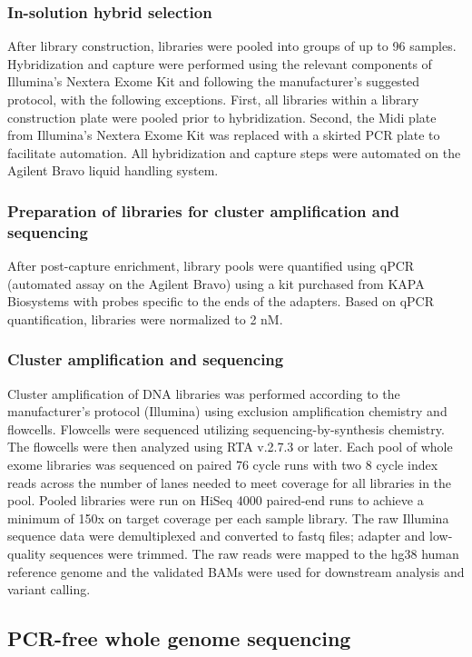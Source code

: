 \subsubsection{In-solution hybrid selection}
After library construction, libraries were pooled into groups of up to 96 samples. Hybridization and capture were performed using the relevant components of Illumina's Nextera Exome Kit and following the manufacturer’s suggested protocol, with the following exceptions. First, all libraries within a library construction plate were pooled prior to hybridization. Second, the Midi plate from Illumina’s Nextera Exome Kit was replaced with a skirted PCR plate to facilitate automation. All hybridization and capture steps were automated on the Agilent Bravo liquid handling system.

\subsubsection{Preparation of libraries for cluster amplification and sequencing}
After post-capture enrichment, library pools were quantified using qPCR (automated assay on the Agilent Bravo) using a kit purchased from KAPA Biosystems with probes specific to the ends of the adapters. Based on qPCR quantification, libraries were normalized to 2 nM.

\subsubsection{Cluster amplification and sequencing}
Cluster amplification of DNA libraries was performed according to the manufacturer’s protocol (Illumina) using exclusion amplification chemistry and flowcells. Flowcells were sequenced utilizing sequencing-by-synthesis chemistry. The flowcells were then analyzed using RTA v.2.7.3 or later. Each pool of whole exome libraries was sequenced on paired 76 cycle runs with two 8 cycle index reads across the number of lanes needed to meet coverage for all libraries in the pool. Pooled libraries were run on HiSeq 4000 paired-end runs to achieve a minimum of 150x on target coverage per each sample library. The raw Illumina sequence data were demultiplexed and converted to fastq files; adapter and low-quality sequences were trimmed. The raw reads were mapped to the hg38 human reference genome and the validated BAMs were used for downstream analysis and variant calling.


\subsection{PCR-free whole genome sequencing}
